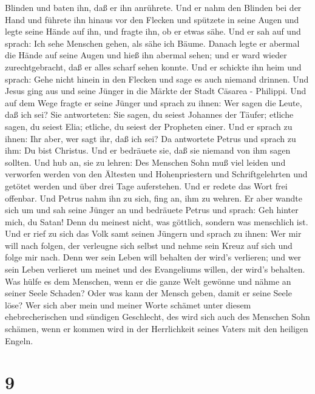 Blinden und baten ihn, daß er ihn anrührete.  Und er nahm
den Blinden bei der Hand und führete ihn hinaus vor den Flecken und
spützete in seine Augen und legte seine Hände auf ihn, und fragte ihn,
ob er etwas sähe.  Und er sah auf und sprach: Ich sehe
Menschen gehen, als sähe ich Bäume.  Danach legte er
abermal die Hände auf seine Augen und hieß ihn abermal sehen; und er
ward wieder zurechtgebracht, daß er alles scharf sehen konnte.
 Und er schickte ihn heim und sprach: Gehe nicht hinein in
den Flecken und sage es auch niemand drinnen.  Und Jesus
ging aus und seine Jünger in die Märkte der Stadt Cäsarea - Philippi.
Und auf dem Wege fragte er seine Jünger und sprach zu ihnen: Wer sagen
die Leute, daß ich sei?  Sie antworteten: Sie sagen, du
seiest Johannes der Täufer; etliche sagen, du seiest Elia; etliche, du
seiest der Propheten einer.  Und er sprach zu ihnen: Ihr
aber, wer sagt ihr, daß ich sei? Da antwortete Petrus und sprach zu ihm:
Du bist Christus.  Und er bedräuete sie, daß sie niemand
von ihm sagen sollten.  Und hub an, sie zu lehren: Des
Menschen Sohn muß viel leiden und verworfen werden von den Ältesten und
Hohenpriestern und Schriftgelehrten und getötet werden und über drei
Tage auferstehen.  Und er redete das Wort frei offenbar.
Und Petrus nahm ihn zu sich, fing an, ihm zu wehren.  Er
aber wandte sich um und sah seine Jünger an und bedräuete Petrus und
sprach: Geh hinter mich, du Satan! Denn du meinest nicht, was göttlich,
sondern was menschlich ist.  Und er rief zu sich das Volk
samt seinen Jüngern und sprach zu ihnen: Wer mir will nach folgen, der
verleugne sich selbst und nehme sein Kreuz auf sich und folge mir nach.
 Denn wer sein Leben will behalten der wird's verlieren;
und wer sein Leben verlieret um meinet und des Evangeliums willen, der
wird's behalten.  Was hülfe es dem Menschen, wenn er die
ganze Welt gewönne und nähme an seiner Seele Schaden?  Oder
was kann der Mensch geben, damit er seine Seele löse?  Wer
sich aber mein und meiner Worte schämet unter diesem ehebrecherischen
und sündigen Geschlecht, des wird sich auch des Menschen Sohn schämen,
wenn er kommen wird in der Herrlichkeit seines Vaters mit den heiligen
Engeln.

\hypertarget{section-8}{%
\section{9}\label{section-8}}

